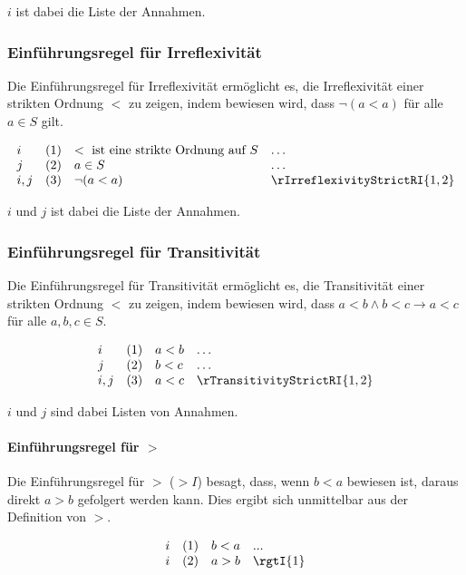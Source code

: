 \documentclass[main.tex]{subfiles}
\begin{document}
\(i\) ist dabei die Liste der Annahmen.

\subsubsection*{Einführungsregel für Irreflexivität}
\label{rule:rIrreflexivityStrictRI}
Die Einführungsregel für Irreflexivität ermöglicht es, die Irreflexivität einer strikten Ordnung \(<\) zu zeigen, indem bewiesen wird, dass \( \neg (a < a) \) für alle \(a \in S\) gilt.

\[
\begin{array}{llll}
    i       & (1) & < \text{ ist eine strikte Ordnung auf } S & \dots \\
    j       & (2) & a \in S & \dots \\
    i,j     & (3) & \neg (a < a) & \rIrreflexivityStrictRI{1,2}
\end{array}
\]

\(i\) und \(j\) ist dabei die Liste der Annahmen.

\subsubsection*{Einführungsregel für Transitivität}
\label{rule:rTransitivityStrictRI}
Die Einführungsregel für Transitivität ermöglicht es, die Transitivität einer strikten Ordnung \(<\) zu zeigen, indem bewiesen wird, dass \(a < b \land b < c \rightarrow a < c\) für alle \(a, b, c \in S\).

\[
\begin{array}{llll}
    i           & (1) & a < b & \dots \\
    j           & (2) & b < c & \dots \\
    i,j         & (3) & a < c & \rTransitivityStrictRI{1,2}
\end{array}
\]

\(i\) und \(j\) sind dabei Listen von Annahmen.

\paragraph{Einführungsregel für \(>\)}
\label{rule:rgtI}
Die Einführungsregel für \(>\) (\(> I\)) besagt, dass, wenn \(b < a\) bewiesen ist, daraus direkt \(a > b\) gefolgert werden kann. Dies ergibt sich unmittelbar aus der Definition von \(>\).

\[
\begin{array}{llll}
    i & (1) & b < a & \text{...} \\
    i & (2) & a > b & \rgtI{1} \\
\end{array}
\]
\end{document}
